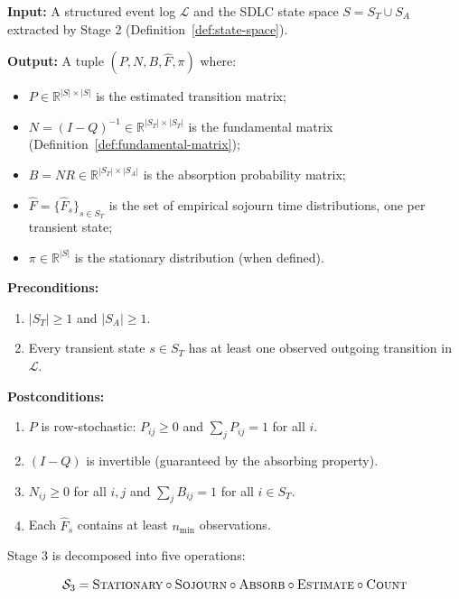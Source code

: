 \begin{definition}
\label{def:contract-s3}
\textbf{Input:} A structured event log $\mathcal{L}$ and the SDLC state 
space $S = S_T \cup S_A$ extracted by Stage 2 
(Definition~\ref{def:state-space}).

\textbf{Output:} A tuple $(P, N, B, \hat{F}, \pi)$ where:
\begin{itemize}
    \item $P \in \mathbb{R}^{|S| \times |S|}$ is the estimated transition matrix;
    \item $N = (I - Q)^{-1} \in \mathbb{R}^{|S_T| \times |S_T|}$ is the 
    fundamental matrix (Definition~\ref{def:fundamental-matrix});
    \item $B = NR \in \mathbb{R}^{|S_T| \times |S_A|}$ is the absorption 
    probability matrix;
    \item $\hat{F} = \{\hat{F}_s\}_{s \in S_T}$ is the set of empirical 
    sojourn time distributions, one per transient state;
    \item $\pi \in \mathbb{R}^{|S|}$ is the stationary distribution 
    (when defined).
\end{itemize}

\textbf{Preconditions:}
\begin{enumerate}
    \item $|S_T| \geq 1$ and $|S_A| \geq 1$.
    \item Every transient state $s \in S_T$ has at least one observed 
    outgoing transition in $\mathcal{L}$.
\end{enumerate}

\textbf{Postconditions:}
\begin{enumerate}
    \item $P$ is row-stochastic: $P_{ij} \geq 0$ and 
    $\sum_j P_{ij} = 1$ for all $i$.
    \item $(I - Q)$ is invertible (guaranteed by the absorbing property).
    \item $N_{ij} \geq 0$ for all $i, j$ and 
    $\sum_j B_{ij} = 1$ for all $i \in S_T$.
    \item Each $\hat{F}_s$ contains at least $n_{\min}$ observations.
\end{enumerate}
\end{definition}

Stage 3 is decomposed into five operations:

\begin{equation}
\label{eq:s3-decomposition}
\mathcal{S}_3 = \textsc{Stationary} \circ \textsc{Sojourn} \circ 
    \textsc{Absorb} \circ \textsc{Estimate} \circ \textsc{Count}
\end{equation}


